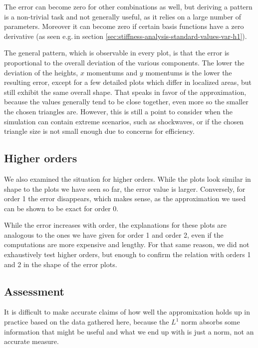 \documentclass{article}
\begin{document}
The error can become zero for other combinations as well, but deriving a pattern is a non-trivial task and not generally useful, as it relies on a large number of parameters. Moreover it can become zero if certain basis functions have a zero derivative (as seen e.g.\,in section \ref{sec:stiffness-analysis-standard-values-var-h1}).

The general pattern, which is observable in every plot, is that the error is proportional to the overall deviation of the various components. The lower the deviation of the heights, $x$ momentums and $y$ momentums is the lower the resulting error, except for a few detailed plots which differ in localized areas, but still exhibit the same overall shape. That speaks in favor of the approximation, because the values generally tend to be close together, even more so the smaller the chosen triangles are. However, this is still a point to consider when the simulation can contain extreme scenarios, such as shockwaves, or if the chosen triangle size is not small enough due to concerns for efficiency.

\subsection{Higher orders}
\label{sec:stiffness-analysis-conclusion-higher-order}

We also examined the situation for higher orders. While the plots look similar in shape to the plots we have seen so far, the error value is larger. Conversely, for order 1 the error disappears, which makes sense, as the approximation we used can be shown to be exact for order 0.

While the error increases with order, the explanations for these plots are analogous to the ones we have given for order 1 and order 2, even if the computations are more expensive and lengthy. For that same reason, we did not exhaustively test higher orders, but enough to confirm the relation with orders 1 and 2 in the shape of the error plots.

\subsection{Assessment}

It is difficult to make accurate claims of how well the appromixation holds up in practice based on the data gathered here, because the $L^1$ norm absorbs some information that might be useful and what we end up with is just a norm, not an accurate measure.
\end{document}
